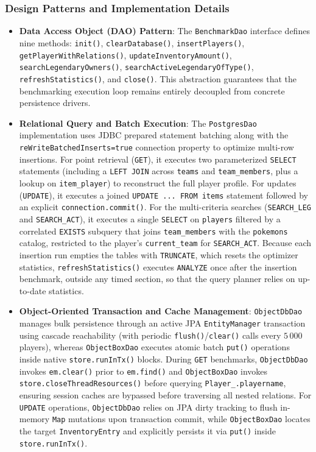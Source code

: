 \documentclass{article}
\begin{document}
\subsubsection{Design Patterns and Implementation Details}
\begin{itemize}
    \item \textbf{Data Access Object (DAO) Pattern}: The \texttt{BenchmarkDao} interface defines nine methods: \texttt{init()}, \texttt{clearDatabase()}, \texttt{insertPlayers()}, \texttt{getPlayerWithRelations()}, \texttt{updateInventoryAmount()},
        \\
        \texttt{searchLegendaryOwners()}, \texttt{searchActiveLegendaryOfType()}, \texttt{refreshStatistics()}, and \texttt{close()}. This abstraction guarantees that the benchmarking execution loop remains entirely decoupled from concrete persistence drivers.
    \item \textbf{Relational Query and Batch Execution}: The \texttt{PostgresDao} implementation uses JDBC prepared statement batching along with the \texttt{reWriteBatchedInserts=true} connection property to optimize multi-row insertions. For point retrieval (\texttt{GET}), it executes two parameterized \texttt{SELECT} statements (including a \texttt{LEFT JOIN} across \texttt{teams} and \texttt{team\_members}, plus a lookup on \texttt{item\_player}) to reconstruct the full player profile. For updates (\texttt{UPDATE}), it executes a joined \texttt{UPDATE ... FROM items} statement followed by an explicit \texttt{connection.commit()}. For the multi-criteria searches (\texttt{SEARCH\_LEG} and \texttt{SEARCH\_ACT}), it executes a single \texttt{SELECT} on \texttt{players} filtered by a correlated \texttt{EXISTS} subquery that joins \texttt{team\_members} with the \texttt{pokemons} catalog, restricted to the player's \texttt{current\_team} for \texttt{SEARCH\_ACT}. Because each insertion run empties the tables with \texttt{TRUNCATE}, which resets the optimizer statistics, \texttt{refreshStatistics()} executes \texttt{ANALYZE} once after the insertion benchmark, outside any timed section, so that the query planner relies on up-to-date statistics.
    \item \textbf{Object-Oriented Transaction and Cache Management}: \texttt{ObjectDbDao} manages bulk persistence through an active JPA \texttt{EntityManager} transaction using cascade reachability (with periodic \texttt{flush()}/\texttt{clear()} calls every $5\,000$ players), whereas \texttt{ObjectBoxDao} executes atomic batch \texttt{put()} operations inside native \texttt{store.runInTx()} blocks. During \texttt{GET} benchmarks, \texttt{ObjectDbDao} invokes \texttt{em.clear()} prior to \texttt{em.find()} and \texttt{ObjectBoxDao} invokes \texttt{store.closeThreadResources()} before querying \texttt{Player\_.playername}, ensuring session caches are bypassed before traversing all nested relations. For \texttt{UPDATE} operations, \texttt{ObjectDbDao} relies on JPA dirty tracking to flush in-memory \texttt{Map} mutations upon transaction commit, while \texttt{ObjectBoxDao} locates the target \texttt{InventoryEntry} and explicitly persists it via \texttt{put()} inside \texttt{store.runInTx()}.
\end{itemize}
\end{document}
